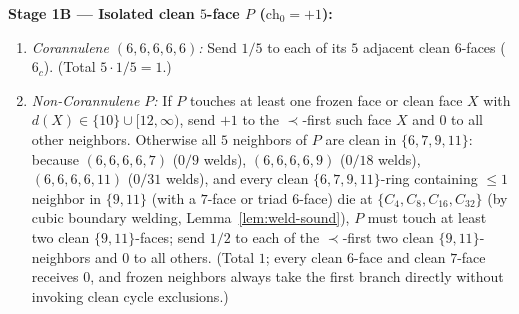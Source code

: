 \documentclass[11pt,reqno]{amsart}
\theoremstyle{plain}
\theoremstyle{definition}
\theoremstyle{remark}
\newcommand{\chz}{\mathrm{ch}_0}
\DeclareRobustCommand{\_}{\ifmmode\text{\textunderscore}\else\textunderscore\allowbreak\fi}
\begin{document}
\noindent\textbf{Stage 1B --- Isolated clean $5$-face $P$ ($\chz = +1$):}
\begin{enumerate}[label=(P\arabic*),leftmargin=2.8em]
  \item \emph{Corannulene $(6, 6, 6, 6, 6)$:} Send $1/5$ to each of its $5$ adjacent clean $6$-faces ($6_c$). (Total $5 \cdot 1/5 = 1$.)
  \item \emph{Non-Corannulene $P$:} If $P$ touches at least one frozen face or clean face $X$ with $d(X) \in \{10\} \cup [12, \infty)$, send $+1$ to the $\prec$-first such face $X$ and $0$ to all other neighbors. Otherwise all $5$ neighbors of $P$ are clean in $\{6, 7, 9, 11\}$: because $(6,6,6,6,7)$ ($0/9$ welds), $(6,6,6,6,9)$ ($0/18$ welds), $(6,6,6,6,11)$ ($0/31$ welds), and every clean $\{6, 7, 9, 11\}$-ring containing $\le 1$ neighbor in $\{9, 11\}$ (with a $7$-face or triad $6$-face) die at $\{C_4, C_8, C_{16}, C_{32}\}$ (by cubic boundary welding, Lemma~\ref{lem:weld-sound}), $P$ must touch at least two clean $\{9, 11\}$-faces; send $1/2$ to each of the $\prec$-first two clean $\{9, 11\}$-neighbors and $0$ to all others. (Total $1$; every clean $6$-face and clean $7$-face receives $0$, and frozen neighbors always take the first branch directly without invoking clean cycle exclusions.)
\end{enumerate}
\end{document}
